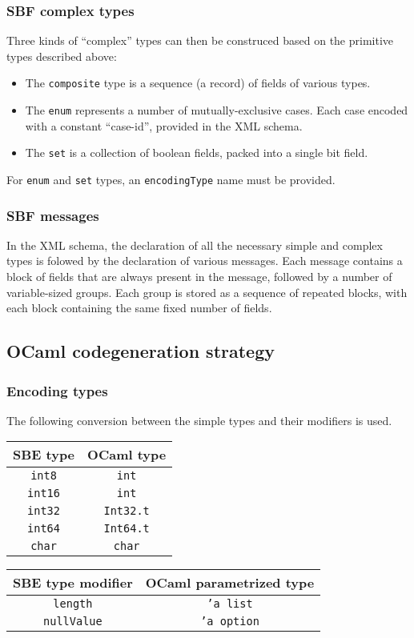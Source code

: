 \documentclass[twoside,a4paper]{refart}
\begin{document}
\subsubsection{SBF complex types}
Three kinds of ``complex'' types can then be construced based on the primitive
types described above:
\begin{itemize}
    \item The \texttt{composite} type is a sequence (a record) of fields
    of various types.  
    \item The \texttt{enum} represents a number of mutually-exclusive
    cases. Each case encoded with a constant ``case-id'', provided in the
    XML schema.
    \item The \texttt{set} is a collection of boolean fields, packed into a
    single bit field.  
\end{itemize}
For \texttt{enum} and \texttt{set} types, an \texttt{encodingType} name must be
provided.
\subsubsection{SBF messages}
In the XML schema, the declaration of all the necessary simple and complex
types is folowed by the declaration of various messages. Each message contains
a block of fields that are always present in the message, followed by a number
of variable-sized groups. Each group is stored as a sequence of repeated
blocks, with each block containing the same fixed number of fields.

\subsection{OCaml codegeneration strategy}
\subsubsection{Encoding types}
The following conversion between the simple types and their modifiers is
used.\\[3mm]

\begin{tabular}{|c|c|}\hline
    SBE type      & OCaml type       \\ \hline
   \texttt{int8}  & \texttt{int}     \\ \hline
   \texttt{int16} & \texttt{int}     \\ \hline
   \texttt{int32} & \texttt{Int32.t} \\ \hline
   \texttt{int64} & \texttt{Int64.t} \\ \hline
   \texttt{char}  & \texttt{char}    \\ \hline 
\end{tabular}\quad
\begin{tabular}{|c|c|}\hline
    SBE type modifier & OCaml parametrized type \\ \hline
   \texttt{length}    & \texttt{'a list}        \\ \hline
   \texttt{nullValue} & \texttt{'a option}      \\ \hline
\end{tabular} \\[3mm]
\end{document}
